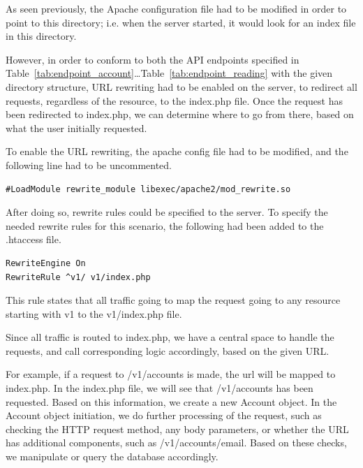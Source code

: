 \documentclass[12pt,openany,a4paper]{book}
\newcommand{\tab}[1]  {Table~\ref{#1}}		%
\begin{document}
As seen previously, the Apache configuration file had to be modified in order to
point to this directory; i.e. when the server started, it would look for an index file in this directory.

However, in order to conform to both the API endpoints specified in
\tab{tab:endpoint_account}\dots\tab{tab:endpoint_reading} with the given directory
structure, URL rewriting had to be
enabled on the server, to redirect all requests, regardless of the resource, to
the index.php file. Once the request has been redirected to index.php, we can
determine where to go from there, based on what the user initially requested.

To enable the URL rewriting, the apache config file had to be modified, and the
following line had to be uncommented.

\begin{verbatim}
#LoadModule rewrite_module libexec/apache2/mod_rewrite.so
\end{verbatim}


After doing so, rewrite rules could be specified to the server. To specify the
needed rewrite rules for this scenario, the following had been added to the
.htaccess file.

\begin{verbatim}
RewriteEngine On
RewriteRule ^v1/ v1/index.php
\end{verbatim}

This rule states that all traffic going to map the request going to any resource
starting with v1 to the v1/index.php file.

Since all traffic is routed to index.php, we have a central space to handle the
requests, and call corresponding logic accordingly, based on the given URL.

For example, if a request to /v1/accounts is made, the url will be mapped to
index.php. In the index.php file, we will see that /v1/accounts has been
requested. Based on this information, we create a new Account object. In the
Account object initiation, we do further processing of the request, such as
checking the HTTP request method, any body parameters, or whether the URL
has additional components, such as /v1/accounts/email. Based on these checks,
we manipulate or query the database accordingly.
\end{document}
